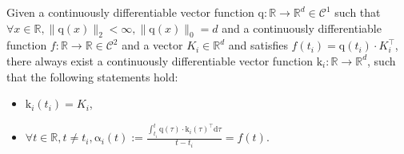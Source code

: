 \begin{lemma}
Given a continuously differentiable vector function $\boldsymbol{\mathrm{q}}: \mathbb{R} \rightarrow \mathbb{R}^d \in \mathcal{C}^1$ such that $\forall x \in \mathbb{R}, \|\boldsymbol{\mathrm{q}}(x)\|_2 < \infty, \|\boldsymbol{\mathrm{q}}(x)\|_0 = d$ and a continuously differentiable function $f: \mathbb{R} \rightarrow \mathbb{R} \in \mathcal{C}^2$ and a vector $K_i \in \mathbb{R}^{d}$ and satisfies $f(t_i) = \boldsymbol{\mathrm{q}}(t_i) \cdot K_i^\top$, there always exist a continuously differentiable vector function $\boldsymbol{\mathrm{k}}_i: \mathbb{R} \rightarrow \mathbb{R}^d$, such that the following statements hold:
\begin{itemize}[leftmargin=5mm]
    \item $\boldsymbol{\mathrm{k}}_i(t_i)=K_i$,
    \item $\forall t \in \mathbb{R}, t \neq t_i, \boldsymbol{\mathrm{\alpha}}_i(t) := \frac{\int_{t_i}^t \boldsymbol{\mathrm{q}}(\tau) \cdot \boldsymbol{\mathrm{k}}_i(\tau)^\top \text{d} \tau}{t-t_i} = f(t)$.
\end{itemize}
\end{lemma}


